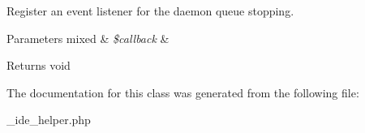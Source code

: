 Register an event listener for the daemon queue stopping.


\begin{DoxyParams}[1]{Parameters}
mixed & {\em \$callback} & \\
\hline
\end{DoxyParams}
\begin{DoxyReturn}{Returns}
void 
\end{DoxyReturn}


The documentation for this class was generated from the following file\+:\begin{DoxyCompactItemize}
\item 
\+\_\+ide\+\_\+helper.\+php\end{DoxyCompactItemize}
